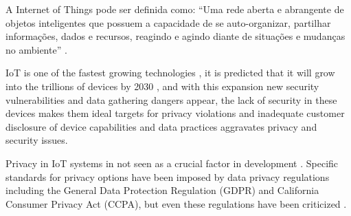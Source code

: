 \documentclass[conference]{IEEEtran}
\begin{document}

A Internet of Things pode ser definida como: ``Uma rede aberta e abrangente de
objetos inteligentes que possuem a capacidade de se auto-organizar, partilhar
informações, dados e recursos, reagindo e agindo diante de situações e mudanças
no ambiente'' \cite{madakam2015internet}.


IoT is one of the fastest growing technologies \cite{MohammadState}, it is
predicted that it will grow into the trillions of devices by 2030 \cite{SarawiInternet},
and with this expansion new security vulnerabilities and data gathering dangers
appear, the lack of security in these devices makes them ideal targets for
privacy violations and inadequate customer disclosure of device capabilities
and data practices aggravates privacy and security issues.

Privacy in IoT systems in not seen as a crucial factor in development \cite{alhirabi2021security}.
Specific standards for privacy options have been imposed by data privacy
regulations including the General Data Protection Regulation (GDPR) and
California Consumer Privacy Act (CCPA), but even these regulations have been
criticized \cite{peloquin2020disruptive, gladis2022weaponizing, gentile2022deficient, green2022flaws, byun2019privacy}.
\end{document}
